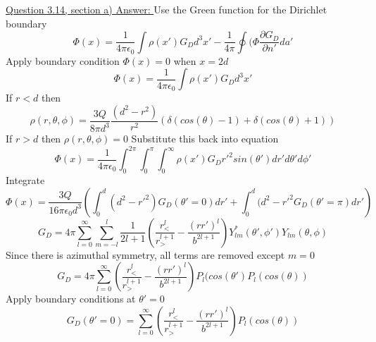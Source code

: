 \documentclass[12pt]{article}
\begin{document}
    \underline{Question 3.14, section a) Answer: }
    Use the Green function for the Dirichlet boundary 
    \begin{equation} \label{eq: 3.14-1}
        \Phi(x) = \frac{1}{4 \pi \epsilon_0} \int \rho(x') G_D d^3x' - \frac{1}{4 \pi} \oint (\Phi \frac{\partial G_D}{\partial n'} da'
    \end{equation}
    Apply boundary condition $\Phi(x) = 0$ when $x=2d$
    \begin{equation} \label{eq: 3.14-2}
        \Phi(x) = \frac{1}{4 \pi \epsilon_0} \int \rho(x') G_D d^3x'
    \end{equation}
    If $r<d$ then
    \begin{equation} \label{eq: 3.14-3}
        \rho(r,\theta,\phi) = \frac{3 Q}{8 \pi d^3} \frac{(d^2 - r^2)}{r^2} \left(\delta(cos(\theta)-1) + \delta(cos(\theta)+1) \right)
    \end{equation}
    If $r>d$ then $\rho(r,\theta,\phi) = 0$
    \newline Substitute this back into equation
    \begin{equation} \label{eq: 3.14-4}
        \Phi(x) = \frac{1}{4 \pi \epsilon_0} \int_0^{2\pi} \int_0^\pi \int_0^\infty \rho(x') G_D {r'}^2 sin(\theta') dr' d\theta' d\phi'
    \end{equation}
    Integrate
    \begin{equation} \label{eq: 3.14-5}
        \Phi(x) = \frac{3 Q}{16 \pi \epsilon_0 d^3} \left(\int_0^d (d^2-{r'}^2) G_D(\theta'=0) dr' + \int_0^d (d^2 - {r'}^2 G_D(\theta'=\pi) dr' \right)
    \end{equation}
    \begin{equation} \label{eq: 3.14-6}
        G_D = 4 \pi \sum_{l=0}^\infty \sum_{m=-l}^l \frac{1}{2l+1} \left(\frac{r_<^l}{r_>^{l+1}} - \frac{(rr')^l}{b^{2l+1}} \right) Y_{lm}^*(\theta',\phi') Y_{lm}(\theta,\phi)
    \end{equation}
    Since there is azimuthal symmetry, all terms are removed except $m=0$
    \begin{equation} \label{eq: 3.14-7}
        G_D = 4 \pi \sum_{l=0}^\infty \left(\frac{r_<^l}{r_>^{l+1}} - \frac{(rr')^l}{b^{2l+1}} \right) P_l(cos(\theta') P_l(cos(\theta))
    \end{equation}
    Apply boundary conditions at $\theta'=0$
    \begin{equation} \label{eq: 3.14-8}
        G_D(\theta'=0) = \sum_{l=0}^\infty \left(\frac{r_<^l}{r_>^{l+1}} - \frac{(rr')^l}{b^{2l+1}} \right) P_l(cos(\theta))
    \end{equation}
\end{document}
